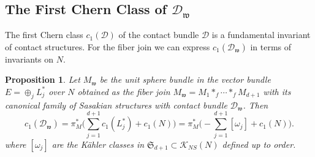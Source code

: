 \documentclass[12pt]{amsart}
\newtheorem{proposition}[theorem]{Proposition}
\def\gro{\omega}
\def\cald{{\mathcal D}}
\def\calk{{\mathcal K}}
\def\gw{{\mathfrak w}}
\def\gS{{\mathfrak S}}
\begin{document}
\subsection{The First Chern Class of $\cald_\gw$}
The first Chern class $c_1(\cald)$ of the contact bundle $\cald$ is a fundamental invariant of contact structures. For the fiber join we can express $c_1(\cald_\gw)$ in terms of invariants on $N$.

\begin{proposition}\label{c1yam}
Let $M_\gw$ be the unit sphere bundle in the vector bundle $E=\oplus_{j}L^*_j$ over $N$ obtained as the fiber join $M_\gw=M_1*_f\cdots *_f M_{d+1}$ with its canonical family of Sasakian structures with contact bundle $\cald_\gw$. Then 
$$c_1(\cald_\gw)=\pi_M^*\bigl(\sum_{j=1}^{d+1}c_1(L^*_j)+c_1(N)\bigr)=\pi_M^*\bigl(-\sum_{j=1}^{d+1}[\gro_j]+c_1(N)\bigr).$$
where $[\gro_j]$ are the K\"ahler classes in $\gS_{d+1}\subset \calk_{NS}(N)$ defined up to order.
\end{proposition}
\end{document}
